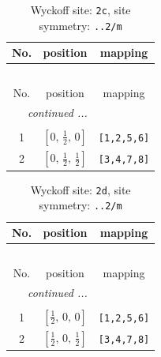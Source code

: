 \documentclass[fleqn,8pt]{jsarticle}
\begin{document}
\renewcommand{\arraystretch}{1.2}
\begin{longtable}{ccc}
\caption{Wyckoff site: {\tt 2c}, site symmetry: {\tt ..2/m}}
 \\
 \hline \hline
No. & position & mapping \\ \hline \endfirsthead

\multicolumn{2}{l}{\tablename\ \thetable{}} \\
 \hline \hline
No. & position & mapping \\ \hline \endhead

 \hline \hline
\multicolumn{2}{r}{\footnotesize\it continued ...} \\ \endfoot

 \hline \hline
\multicolumn{2}{r}{} \\ \endlastfoot

1 & $\left[ 0,\, \frac{1}{2},\, 0 \right]$ & {\tt [1,2,5,6]} \\ \hline
2 & $\left[ 0,\, \frac{1}{2},\, \frac{1}{2} \right]$ & {\tt [3,4,7,8]} \\
\end{longtable}
\renewcommand{\arraystretch}{1.2}
\begin{longtable}{ccc}
\caption{Wyckoff site: {\tt 2d}, site symmetry: {\tt ..2/m}}
 \\
 \hline \hline
No. & position & mapping \\ \hline \endfirsthead

\multicolumn{2}{l}{\tablename\ \thetable{}} \\
 \hline \hline
No. & position & mapping \\ \hline \endhead

 \hline \hline
\multicolumn{2}{r}{\footnotesize\it continued ...} \\ \endfoot

 \hline \hline
\multicolumn{2}{r}{} \\ \endlastfoot

1 & $\left[ \frac{1}{2},\, 0,\, 0 \right]$ & {\tt [1,2,5,6]} \\ \hline
2 & $\left[ \frac{1}{2},\, 0,\, \frac{1}{2} \right]$ & {\tt [3,4,7,8]} \\
\end{longtable}
\renewcommand{\arraystretch}{1.2}
\end{document}
